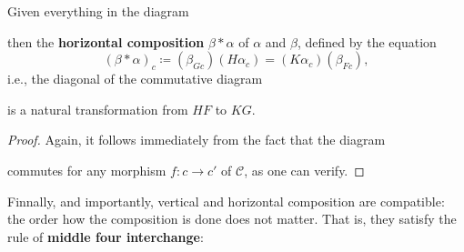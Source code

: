 	\begin{lemma}
	Given everything in the diagram
	\begin{center}
	\end{center}
	then the \textbf{horizontal composition} $\beta\ast\alpha$ of $\alpha$ and $\beta$, defined by the equation
	\[(\beta\ast\alpha)_c\coloneqq (\beta_{Gc})(H\alpha_c)=(K\alpha_c)(\beta_{Fc}),\]
	i.e., the diagonal of the commutative diagram
	\begin{center}
	\end{center}
	is a natural transformation from $HF$ to $KG$.
	\end{lemma}
	\begin{proof}
	Again, it follows immediately from the fact that the diagram
	\begin{center}
	\end{center}
	commutes for any morphism $f:c\to c'$ of $\mathcal{C}$, as one can verify.
	\end{proof}
	Finnally, and importantly, vertical and horizontal composition are compatible: the order how the composition is done does not matter. That is, they satisfy the rule of \textbf{middle four interchange}:
